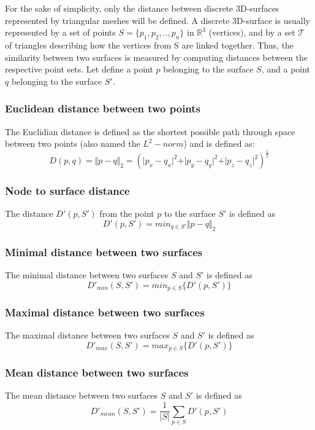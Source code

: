 For the sake of simplicity, only the distance between discrete 3D-surfaces represented by triangular meshes will be defined. A discrete 3D-surface is usually represented by a set of points $S = \lbrace p_1, p_2, ..,p_n \rbrace$ in $\mathbb{R}^3$ (vertices),  and by a set $\mathcal{T}$ of triangles describing how the vertices from S are linked together. Thus, the similarity between two surfaces is measured by computing distances between the respective point sets.  
Let define a point $p$ belonging to the surface $S$, and a point $q$ belonging to the surface $S'$.

\subsubsection*{Euclidean distance between two points}
The Euclidian distance is defined as the shortest possible path through space between two points (also named the $L^2-norm$) and is defined as:
\begin{equation}
D(p,q) =\Vert p-q \Vert_2  =(\vert p_x -q_x\vert^2+\vert p_y-q_y\vert^2+\vert p_z-q_z\vert^2)^{\frac{1}{2}}
\end{equation}
\subsubsection*{Node to surface distance}
 The distance $D'(p, S')$ from the point $p$ to the surface $S'$ is defined as
\begin{equation}
D'(p,S') = min_{q \in S'} \Vert p-q\Vert_2
\end{equation}
\subsubsection*{Minimal distance between two surfaces}
The minimal distance between two surfaces $S$ and $S'$ is defined as 
\begin{equation}
D'_{min}(S, S') =  min_{p \in S} \lbrace D'(p, S') \rbrace
\end{equation}
\subsubsection*{Maximal distance between two surfaces}
The maximal distance between two surfaces $S$ and $S'$ is defined as 
\begin{equation}
D'_{max}(S, S') =  max_{p \in S} \lbrace D'(p, S')\rbrace
\end{equation}

\subsubsection*{Mean distance between two surfaces}
The mean distance between two surfaces $S$ and $S'$ is defined as 
\begin{equation}
D'_{mean}(S, S') = \frac{1}{\vert S \vert} \sum_{p \in S}  D'(p, S') 
\end{equation}

